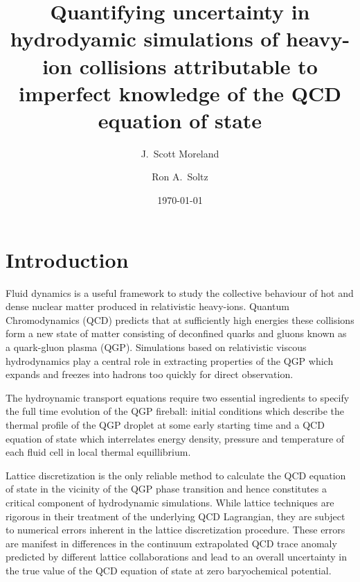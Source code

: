 \documentclass[aps,prc,reprint,amsmath,nofootinbib,superscriptaddress]{revtex4-1}
\begin{document}
\title{Quantifying uncertainty in hydrodyamic simulations of heavy-ion collisions attributable to imperfect knowledge of the 
QCD equation of state}

\author{J.\ Scott Moreland}
\author{Ron A.\ Soltz}

\date{\today}

\begin{abstract} 
   
\end{abstract}

\maketitle

\section{Introduction}

Fluid dynamics is a useful framework to study the collective behaviour of hot and dense nuclear matter produced in 
relativistic heavy-ions. Quantum Chromodynamics (QCD) predicts that at sufficiently high energies these collisions form 
a new state of matter consisting of deconfined quarks and gluons known as a quark-gluon plasma (QGP). Simulations based
on relativistic viscous hydrodynamics play a central role in extracting properties of the QGP which expands and freezes
into hadrons too quickly for direct observation.

The hydroynamic transport equations require two essential ingredients to specify the full time evolution of the QGP fireball: 
initial conditions which describe the thermal profile of the QGP droplet at some early starting time and a QCD equation 
of state which interrelates energy density, pressure and temperature of each fluid cell in local thermal equillibrium.

Lattice discretization is the only reliable method to calculate the QCD equation of state in the vicinity of the QGP phase transition and 
hence constitutes a critical component of hydrodynamic simulations. While lattice techniques are rigorous in their treatment of the 
underlying QCD Lagrangian, they are subject to numerical errors inherent in the lattice discretization procedure. These errors are manifest in 
differences in the continuum extrapolated QCD trace anomaly predicted by different lattice collaborations and lead to an overall uncertainty 
in the true value of the QCD equation of state at zero baryochemical potential.
\end{document}
